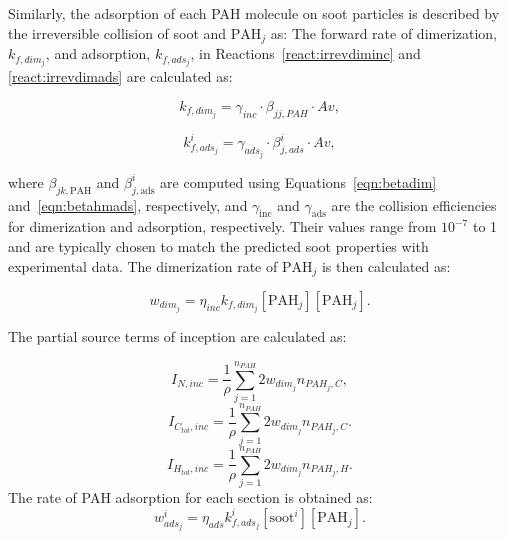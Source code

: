 Similarly, the adsorption of each PAH molecule on soot particles is described by the irreversible collision of soot and $\mathrm{PAH}_j$ as:
The forward rate of dimerization, ${k_{f,dim_j}}$, and adsorption, $k_{f,ads_j}$, in Reactions~\eqref{react:irrevdiminc} and \eqref{react:irrevdimads} are calculated as:

\begin{equation}
	k_{f,dim_j}=
	\gamma_{inc}\cdot\beta_{jj,PAH}\cdot Av
	\label{eqn:kfdim},
\end{equation}

\begin{equation}
	k^i_{f,ads_j}=
	\gamma_{ads_j}\cdot\beta^i_{j,ads}\cdot Av
	\label{eqn:kfads},
\end{equation}

\noindent where $\beta_{jk,\mathrm{PAH}}$ and $\beta^i_{j,\mathrm{ads}}$ are computed using Equations~\eqref{eqn:betadim} and~\eqref{eqn:betahmads}, respectively, and $\gamma_{\mathrm{inc}}$ and $\gamma_{\mathrm{ads}}$ are the collision efficiencies for dimerization and adsorption, respectively. Their values range from $\mathrm{10^{-7}}$ to 1 and are typically chosen to match the predicted soot properties with experimental data. The dimerization rate of $\mathrm{PAH}_j$ is then calculated as:

\begin{equation}
	w_{dim_j} = \eta_{inc} k_{f,dim_{j}} [\mathrm{PAH}_j] [\mathrm{PAH}_j].
	\label{eqn:irrevdim_wdim}
\end{equation}

The partial source terms of inception are calculated as:

\begin{equation}
	I_{N,inc} =\frac{1}{\rho} \sum_{j=1}^{n_{PAH}} 2w_{dim_j} n_{PAH_j,C},
	\label{eqn:INinc}
\end{equation}
\begin{equation}
	I_{C_{tot},inc} = \frac{1}{\rho}\sum_{j=1}^{n_{PAH}} 2w_{dim_j} n_{PAH_j,C}.
	\label{eqn:ICtotinc}
\end{equation}
\begin{equation}
	I_{H_{tot},inc} =\frac{1}{\rho} \sum_{j=1}^{n_{PAH}} 2w_{dim_j} n_{PAH_j,H}.
	\label{eqn:IHtotinc}
\end{equation}
The rate of PAH adsorption for each section is obtained as:
\begin{equation}
	w^i_{ads_j} = \eta_{ads} k^i_{f,ads_{j}} [\mathrm{soot}^i] [\mathrm{PAH}_j].
	\label{eqn:adsrate_irrevdim}
\end{equation}

